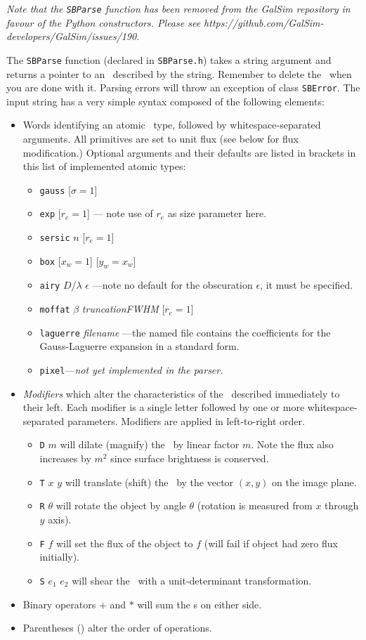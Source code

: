 \documentclass[11pt,preprint,flushrt]{aastex}
\begin{document}
\emph{Note that the {\tt SBParse} function has been removed from the GalSim repository in favour of the Python constructors.  Please see https://github.com/GalSim-developers/GalSim/issues/190}.

The {\tt SBParse} function (declared in {\tt SBParse.h}) takes a string argument and returns a pointer to an \sbp\ described by the string.  Remember to delete the \sbp\ when you are done with it.  Parsing errors will throw an exception of class {\tt SBError}.  The input string has a very simple syntax composed of the following elements:
\begin{itemize}
\item Words identifying an atomic \sbp\ type, followed by whitespace-separated arguments.  All primitives are set to unit flux (see below for flux modification.) Optional arguments and their defaults are listed in brackets in this list of implemented atomic types:
\begin{itemize}
\item {\tt gauss} [$\sigma=1$]
\item {\tt exp} [$r_e=1$] --- note use of $r_e$ as size parameter here.
\item {\tt sersic} $n$ [$r_e=1$]
\item {\tt box} [$x_w=1$] [$y_w=x_w$]
\item {\tt airy} $D/\lambda$ $\epsilon$ ---note no default for the obscuration $\epsilon$, it must be specified.
\item {\tt moffat} $\beta$ {\em truncationFWHM} [$r_e=1$]
\item {\tt laguerre} {\em filename} ---the named file contains the coefficients for the Gauss-Laguerre expansion in a standard form.
\item {\tt pixel}---{\em not yet implemented in the parser.}
\end{itemize}
\item {\em Modifiers} which alter the characteristics of the \sbp\ described immediately to their left.  Each modifier is a single letter followed by one or more whitespace-separated parameters.  Modifiers are applied in left-to-right order.
\begin{itemize}
\item {\tt D} $m$  will dilate (magnify) the \sbp\ by linear factor $m$.  Note the flux also increases by $m^2$ since surface brightness is conserved.
\item {\tt T} $x$ $y$ will translate (shift) the \sbp\ by the vector $(x,y)$ on the image plane.
\item {\tt R} $\theta$ will rotate the object by angle $\theta$ (rotation is measured from $x$ through $y$ axis).
\item {\tt F} $f$  will set the flux of the object to $f$ (will fail if object had zero flux initially).
\item {\tt S} $e_1$ $e_2$  will shear the \sbp\ with a unit-determinant transformation.
\end{itemize}
\item Binary operators $+$ and $*$ will sum the {\sbp}s on either side.
\item Parentheses () alter the order of operations.  
\end{itemize}
\end{document}
